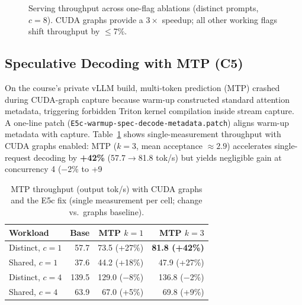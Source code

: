 \documentclass[10pt,letterpaper,twocolumn]{article}
\begin{document}
\begin{figure}[t]
\centering
{}
\caption{Serving throughput across one-flag ablations (distinct prompts, $c{=}8$). CUDA graphs provide a $3\times$ speedup; all other working flags shift throughput by $\le$7\%.}\label{fig:serving}
\end{figure}

\subsection{Speculative Decoding with MTP (C5)}\label{sec:mtp}

On the course's private vLLM build, multi-token prediction (MTP) crashed during CUDA-graph capture because warm-up
constructed standard attention metadata, triggering forbidden Triton kernel compilation inside stream capture. A
one-line patch (\texttt{E5c-warmup-spec-decode-metadata.patch}) aligns warm-up metadata with capture. Table~\ref{tab:mtp}
shows single-measurement throughput with CUDA graphs enabled: MTP ($k{=}3$, mean acceptance $\approx 2.9$) accelerates
single-request decoding by \textbf{+42\%} (57.7$\rightarrow$81.8 tok/s) but yields negligible gain at concurrency 4
($-$2\% to +9%

\begin{table}[t]
\centering\footnotesize
\caption{MTP throughput (output tok/s) with CUDA graphs and the E5c fix (single measurement per cell; change vs.\ graphs baseline).}\label{tab:mtp}
\renewcommand{\arraystretch}{1.12}
\setlength{\tabcolsep}{4pt}
\begin{tabular}{@{}l r r r@{}}
\toprule
\textbf{Workload} & \textbf{Base} & \textbf{MTP $k{=}1$} & \textbf{MTP $k{=}3$} \\
\midrule
Distinct, $c{=}1$ & 57.7 & 73.5 (+27\%) & \textbf{81.8 (+42\%)} \\
Shared, $c{=}1$ & 37.6 & 44.2 (+18\%) & 47.9 (+27\%) \\
Distinct, $c{=}4$ & 139.5 & 129.0 ($-$8\%) & 136.8 ($-$2\%) \\
Shared, $c{=}4$ & 63.9 & 67.0 (+5\%) & 69.8 (+9\%) \\
\bottomrule
\end{tabular}
\end{table}
\end{document}
